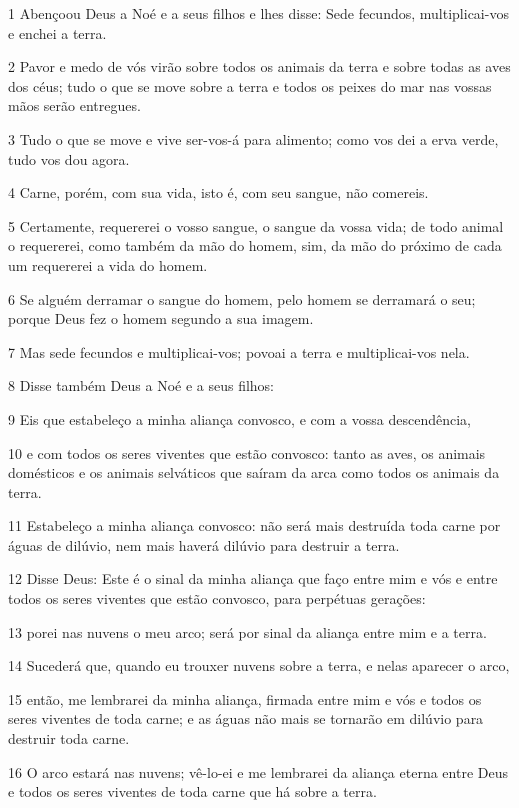 \par 1 Abençoou Deus a Noé e a seus filhos e lhes disse: Sede fecundos, multiplicai-vos e enchei a terra.
\par 2 Pavor e medo de vós virão sobre todos os animais da terra e sobre todas as aves dos céus; tudo o que se move sobre a terra e todos os peixes do mar nas vossas mãos serão entregues.
\par 3 Tudo o que se move e vive ser-vos-á para alimento; como vos dei a erva verde, tudo vos dou agora.
\par 4 Carne, porém, com sua vida, isto é, com seu sangue, não comereis.
\par 5 Certamente, requererei o vosso sangue, o sangue da vossa vida; de todo animal o requererei, como também da mão do homem, sim, da mão do próximo de cada um requererei a vida do homem.
\par 6 Se alguém derramar o sangue do homem, pelo homem se derramará o seu; porque Deus fez o homem segundo a sua imagem.
\par 7 Mas sede fecundos e multiplicai-vos; povoai a terra e multiplicai-vos nela.
\par 8 Disse também Deus a Noé e a seus filhos:
\par 9 Eis que estabeleço a minha aliança convosco, e com a vossa descendência,
\par 10 e com todos os seres viventes que estão convosco: tanto as aves, os animais domésticos e os animais selváticos que saíram da arca como todos os animais da terra.
\par 11 Estabeleço a minha aliança convosco: não será mais destruída toda carne por águas de dilúvio, nem mais haverá dilúvio para destruir a terra.
\par 12 Disse Deus: Este é o sinal da minha aliança que faço entre mim e vós e entre todos os seres viventes que estão convosco, para perpétuas gerações:
\par 13 porei nas nuvens o meu arco; será por sinal da aliança entre mim e a terra.
\par 14 Sucederá que, quando eu trouxer nuvens sobre a terra, e nelas aparecer o arco,
\par 15 então, me lembrarei da minha aliança, firmada entre mim e vós e todos os seres viventes de toda carne; e as águas não mais se tornarão em dilúvio para destruir toda carne.
\par 16 O arco estará nas nuvens; vê-lo-ei e me lembrarei da aliança eterna entre Deus e todos os seres viventes de toda carne que há sobre a terra.
